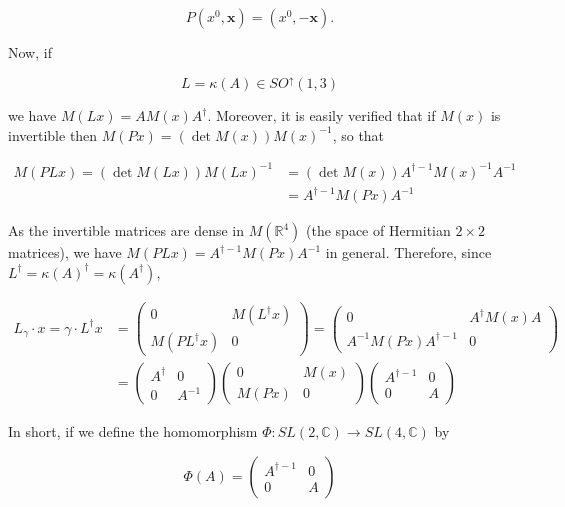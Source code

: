 \documentclass[10pt, letterpaper]{article}
\begin{document}
$$
P\left(x^{0}, \mathbf{x}\right)=\left(x^{0},-\mathbf{x}\right) .
$$

Now, if

$$
L=\kappa(A) \in S O^{\uparrow}(1,3)
$$

we have $M(L x)=A M(x) A^{\dagger}$. Moreover, it is easily verified that if $M(x)$ is invertible then $M(P x)=(\operatorname{det} M(x)) M(x)^{-1}$, so that

$$
\begin{aligned}
M(P L x)=(\operatorname{det} M(L x)) M(L x)^{-1} & =(\operatorname{det} M(x)) A^{\dagger-1} M(x)^{-1} A^{-1} \\
& =A^{\dagger-1} M(P x) A^{-1}
\end{aligned}
$$

As the invertible matrices are dense in $M\left(\mathbb{R}^{4}\right)$ (the space of Hermitian $2 \times 2$ matrices), we have $M(P L x)=A^{\dagger-1} M(P x) A^{-1}$ in general. Therefore, since $L^{\dagger}= \kappa(A)^{\dagger}=\kappa\left(A^{\dagger}\right)$,

$$
\begin{aligned}
L_{\gamma} \cdot x=\gamma \cdot L^{\dagger} x & =\left(\begin{array}{cc}
0 & M\left(L^{\dagger} x\right) \\
M\left(P L^{\dagger} x\right) & 0
\end{array}\right)=\left(\begin{array}{cc}
0 & A^{\dagger} M(x) A \\
A^{-1} M(P x) A^{\dagger-1} & 0
\end{array}\right) \\
& =\left(\begin{array}{cc}
A^{\dagger} & 0 \\
0 & A^{-1}
\end{array}\right)\left(\begin{array}{cc}
0 & M(x) \\
M(P x) & 0
\end{array}\right)\left(\begin{array}{cc}
A^{\dagger-1} & 0 \\
0 & A
\end{array}\right)
\end{aligned}
$$

In short, if we define the homomorphism $\Phi: S L(2, \mathbb{C}) \rightarrow S L(4, \mathbb{C})$ by

$$
\Phi(A)=\left(\begin{array}{cc}
A^{\dagger-1} & 0 \\
0 & A
\end{array}\right)
$$
\end{document}
